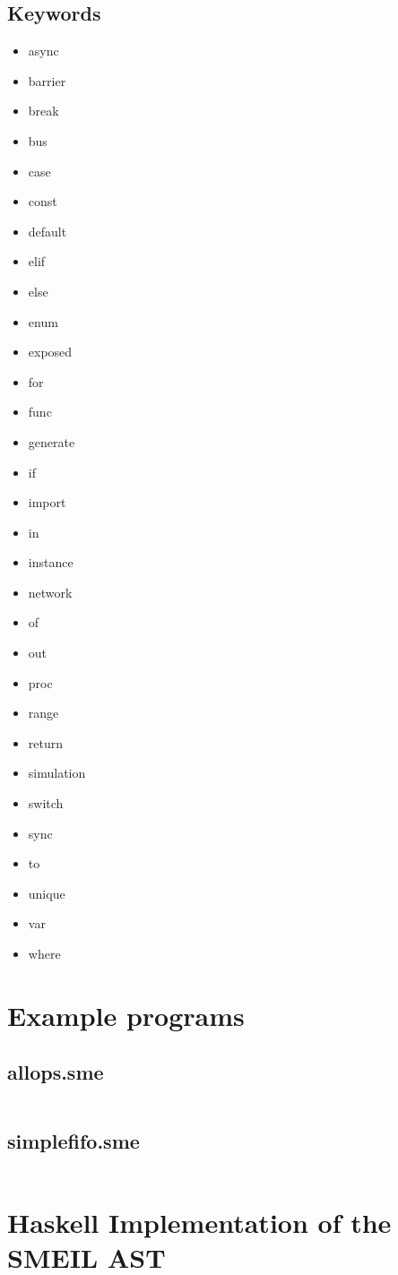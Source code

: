 \documentclass{article}
\begin{document}
\subsection{Keywords}
\begin{multicols}{3}
  \begin{itemize}
  \item async
  \item barrier
  \item break
  \item bus
  \item case
  \item const
  \item default
  \item elif
  \item else
  \item enum
  \item exposed
  \item for
  \item func
  \item generate
  \item if
  \item import
  \item in
  \item instance
  \item network
  \item of
  \item out
  \item proc
  \item range
  \item return
  \item simulation
  \item switch
  \item sync
  \item to
  \item unique
  \item var
  \item where
  \end{itemize}
\end{multicols}

\section{Example programs}

\subsection{allops.sme}
\inputminted[fontsize=\small]{c}{samples/allops3.sme}

\subsection{simplefifo.sme}
\inputminted[fontsize=\small]{c}{samples/simplefifo.sme}

\newpage
\appendix
\section{Haskell Implementation of the SMEIL AST}
\label{hsast}
\inputminted[fontsize=\small]{haskell}{../../src/Language/SMEIL/Syntax.hs}
\end{document}
